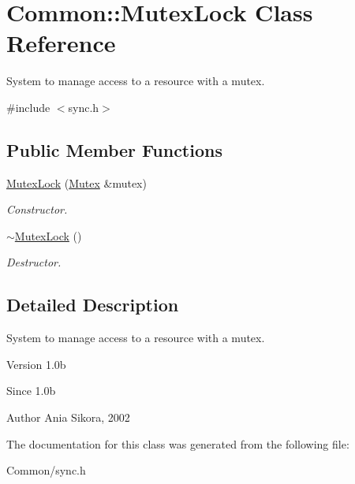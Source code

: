\hypertarget{class_common_1_1_mutex_lock}{\section{Common\-:\-:Mutex\-Lock Class Reference}
\label{class_common_1_1_mutex_lock}
}


System to manage access to a resource with a mutex.  




{\ttfamily \#include $<$sync.\-h$>$}

\subsection*{Public Member Functions}
\begin{DoxyCompactItemize}
\item 
\hypertarget{class_common_1_1_mutex_lock_a9004e1a2a9c4202a74962c36ad21e018}{\hyperlink{class_common_1_1_mutex_lock_a9004e1a2a9c4202a74962c36ad21e018}{Mutex\-Lock} (\hyperlink{class_common_1_1_mutex}{Mutex} \&mutex)}\label{class_common_1_1_mutex_lock_a9004e1a2a9c4202a74962c36ad21e018}

\begin{DoxyCompactList}\small\item\em Constructor. \end{DoxyCompactList}\item 
\hypertarget{class_common_1_1_mutex_lock_affd89ce38a023916e8dee3e018b57b1c}{\hyperlink{class_common_1_1_mutex_lock_affd89ce38a023916e8dee3e018b57b1c}{$\sim$\-Mutex\-Lock} ()}\label{class_common_1_1_mutex_lock_affd89ce38a023916e8dee3e018b57b1c}

\begin{DoxyCompactList}\small\item\em Destructor. \end{DoxyCompactList}\end{DoxyCompactItemize}


\subsection{Detailed Description}
System to manage access to a resource with a mutex. 

\begin{DoxyVersion}{Version}
1.\-0b 
\end{DoxyVersion}
\begin{DoxySince}{Since}
1.\-0b 
\end{DoxySince}
\begin{DoxyAuthor}{Author}
Ania Sikora, 2002 
\end{DoxyAuthor}


The documentation for this class was generated from the following file\-:\begin{DoxyCompactItemize}
\item 
Common/sync.\-h\end{DoxyCompactItemize}
